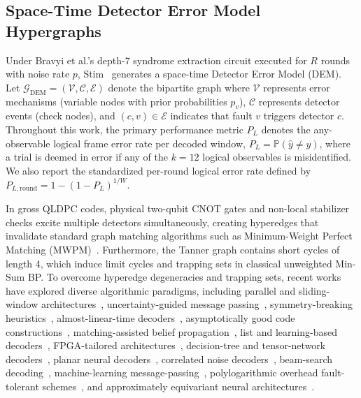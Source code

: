 \documentclass[journal]{IEEEtran}
\begin{document}
\subsection{Space-Time Detector Error Model Hypergraphs}
Under Bravyi et al.'s depth-7 syndrome extraction circuit executed for $R$ rounds with noise rate $p$, Stim~\cite{gidney2021stim} generates a space-time Detector Error Model (DEM). Let $\mathcal{G}_{\text{DEM}} = (\mathcal{V}, \mathcal{C}, \mathcal{E})$ denote the bipartite graph where $\mathcal{V}$ represents error mechanisms (variable nodes with prior probabilities $p_v$), $\mathcal{C}$ represents detector events (check nodes), and $(c, v) \in \mathcal{E}$ indicates that fault $v$ triggers detector $c$. Throughout this work, the primary performance metric $P_L$ denotes the any-observable logical frame error rate per decoded window, $P_L = \mathbb{P}(\hat{y} \ne y)$, where a trial is deemed in error if any of the $k = 12$ logical observables is misidentified. We also report the standardized per-round logical error rate defined by $P_{L,\text{round}} = 1 - (1 - P_L)^{1/W}$.

In gross QLDPC codes, physical two-qubit CNOT gates and non-local stabilizer checks excite multiple detectors simultaneously, creating hyperedges that invalidate standard graph matching algorithms such as Minimum-Weight Perfect Matching (MWPM)~\cite{dennis2002topological,higgott2023pymatching}. Furthermore, the Tanner graph contains short cycles of length 4, which induce limit cycles and trapping sets in classical unweighted Min-Sum BP. To overcome hyperedge degeneracies and trapping sets, recent works have explored diverse algorithmic paradigms, including parallel and sliding-window architectures~\cite{skoric2022parallel,tan2022scalable}, uncertainty-guided message passing~\cite{mi2025uncertainty}, symmetry-breaking heuristics~\cite{yin2024symbreak}, almost-linear-time decoders~\cite{demarti2024almost}, asymptotically good code constructions~\cite{panteleev2023asymptotically}, matching-assisted belief propagation~\cite{sahay2026matching}, list and learning-based decoders~\cite{moradi2024learning,moradi2024list}, FPGA-tailored architectures~\cite{tan2024fpga}, decision-tree and tensor-network decoders~\cite{ott2025decision,beni2025tesseract}, planar neural decoders~\cite{liang2025planar}, correlated noise decoders~\cite{liu2025decoding}, beam-search decoding~\cite{ye2025beam}, machine-learning message-passing~\cite{blue2025machine}, polylogarithmic overhead fault-tolerant schemes~\cite{yamasaki2024polylog}, and approximately equivariant neural architectures~\cite{wang2022approximately}.
\end{document}
